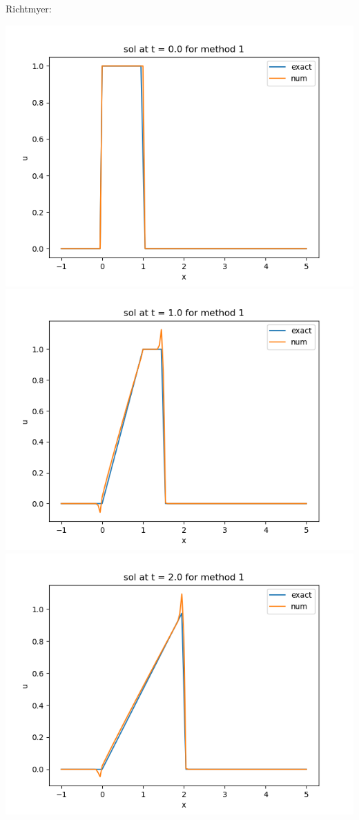 \documentclass{article}
\begin{document}
\begin{enumerate}
Richtmyer:
\begin{center}
	\includegraphics[scale=.23]{hw13 sol t = 0 method 1}
	\includegraphics[scale=.23]{hw13 sol t = 1 method 1}
	\includegraphics[scale=.23]{hw13 sol t = 2 method 1}

\end{center}
\end{enumerate}
\end{document}

